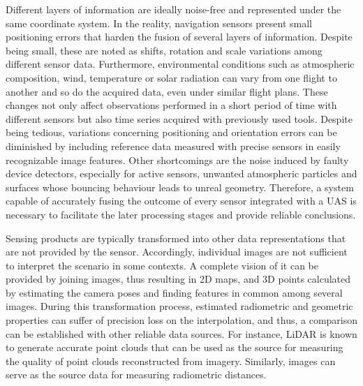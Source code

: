 Different layers of information are ideally noise-free and represented under the same coordinate system. In the reality, navigation sensors present small positioning errors that harden the fusion of several layers of information. Despite being small, these are noted as shifts, rotation and scale variations among different sensor data. Furthermore, environmental conditions such as atmospheric composition, wind, temperature or solar radiation can vary from one flight to another and so do the acquired data, even under similar flight plans. These changes not only affect observations performed in a short period of time with different sensors but also time series acquired with previously used tools. Despite being tedious, variations concerning positioning and orientation errors can be diminished by including reference data measured with precise sensors in easily recognizable image features. Other shortcomings are the noise induced by faulty device detectors, especially for active sensors, unwanted atmospheric particles and surfaces whose bouncing behaviour leads to unreal geometry. Therefore, a system capable of accurately fusing the outcome of every sensor integrated with a UAS is necessary to facilitate the later processing stages and provide reliable conclusions. 

Sensing products are typically transformed into other data representations that are not provided by the sensor. Accordingly, individual images are not sufficient to interpret the scenario in some contexts. A complete vision of it can be provided by joining images, thus resulting in 2D maps, and 3D points calculated by estimating the camera poses and finding features in common among several images. During this transformation process, estimated radiometric and geometric properties can suffer of precision loss on the interpolation, and thus, a comparison can be established with other reliable data sources. For instance, LiDAR is known to generate accurate point clouds that can be used as the source for measuring the quality of point clouds reconstructed from imagery. Similarly, images can serve as the source data for measuring radiometric distances.   


